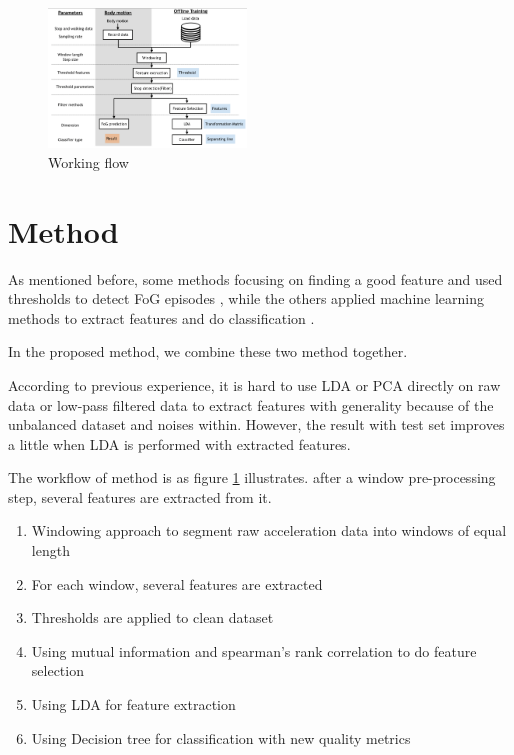 \documentclass[article]{article}
\begin{document}
    
    \begin{figure}
    	\centering
    	\includegraphics[width=0.47\textwidth]{procedures}
    	\caption{Working flow}
    	 \label{fig:procedure}
    	
    \end{figure}


\section{Method}

As mentioned before, some methods focusing on finding a good feature and used thresholds to detect FoG episodes \cite{FI}\cite{FI1}\cite{WM} , while the others applied machine learning methods to extract features and do classification \cite{Flo}\cite{ML}.

In the proposed method, we combine these two method together.

According to previous experience, it is hard to use LDA or PCA directly on raw data or low-pass filtered data to extract features with generality because of the unbalanced dataset and noises within.
However, the result with test set improves a little when LDA is performed with extracted features. 

The workflow of method is as figure \ref{fig:procedure} illustrates.
 after a window pre-processing step, several features are extracted from it.
\begin{enumerate}
\item Windowing approach to segment raw acceleration data into windows of equal length
\item For each window, several features are extracted
\item Thresholds are applied to clean dataset
\item Using mutual information and spearman's rank correlation to do feature selection		
\item Using LDA for feature extraction
\item Using Decision tree for classification with new quality metrics
 		
\end{enumerate}
\end{document}
